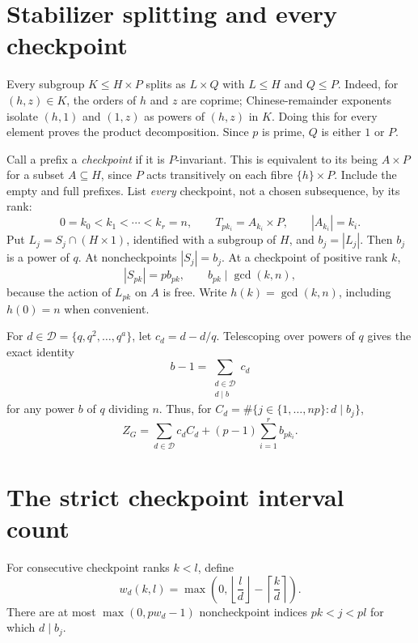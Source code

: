\documentclass[11pt,letterpaper]{article}
\theoremstyle{definition}
\begin{document}
\section{Stabilizer splitting and every checkpoint}
Every subgroup $K\le H\times P$ splits as $L\times Q$ with $L\le H$ and $Q\le P$. Indeed, for $(h,z)\in K$, the orders of $h$ and $z$ are coprime; Chinese-remainder exponents isolate $(h,1)$ and $(1,z)$ as powers of $(h,z)$ in $K$. Doing this for every element proves the product decomposition. Since $p$ is prime, $Q$ is either $1$ or $P$.

Call a prefix a \emph{checkpoint} if it is $P$-invariant. This is equivalent to its being $A\times P$ for a subset $A\subseteq H$, since $P$ acts transitively on each fibre $\{h\}\times P$. Include the empty and full prefixes. List \emph{every} checkpoint, not a chosen subsequence, by its rank:
\begin{equation}
0=k_0<k_1<\cdots<k_r=n,\qquad T_{pk_i}=A_{k_i}\times P,\qquad |A_{k_i}|=k_i.\label{eq:path}
\end{equation}
Put $L_j=S_j\cap(H\times1)$, identified with a subgroup of $H$, and $b_j=|L_j|$. Then $b_j$ is a power of $q$. At noncheckpoints $|S_j|=b_j$. At a checkpoint of positive rank $k$,
\[
|S_{pk}|=p b_{pk},\qquad b_{pk}\mid\gcd(k,n),
\]
because the action of $L_{pk}$ on $A$ is free. Write $h(k)=\gcd(k,n)$, including $h(0)=n$ when convenient.

For $d\in\mathcal D=\{q,q^2,\ldots,q^a\}$, let $c_d=d-d/q$. Telescoping over powers of $q$ gives the exact identity
\[
b-1=\sum_{\substack{d\in\mathcal D\\d\mid b}}c_d
\]
for any power $b$ of $q$ dividing $n$. Thus, for
$C_d=\#\{j\in\{1,\ldots,np\}:d\mid b_j\}$,
\begin{equation}
Z_G=\sum_{d\in\mathcal D}c_d C_d+(p-1)\sum_{i=1}^r b_{pk_i}.\label{eq:decomp}
\end{equation}

\section{The strict checkpoint interval count}
For consecutive checkpoint ranks $k<l$, define
\begin{equation}
w_d(k,l)=\max\left(0,\left\lfloor\frac ld\right\rfloor-\left\lceil\frac kd\right\rceil\right).\label{eq:w}
\end{equation}
There are at most $\max(0,pw_d-1)$ noncheckpoint indices $pk<j<pl$ for which $d\mid b_j$.
\end{document}
